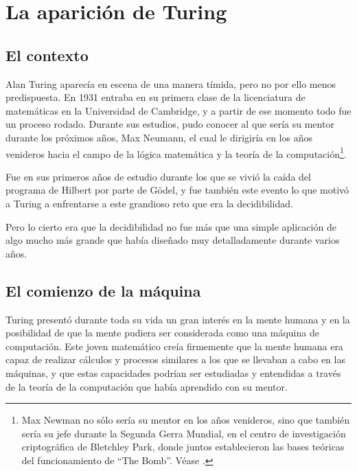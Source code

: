 
\chapter{La aparición de Turing}

\section{El contexto}
Alan Turing aparecía en escena de una manera tímida, pero no por ello menos predispuesta. En 1931 entraba en su primera clase de la licenciatura de matemáticas en la Universidad de Cambridge, 
y a partir de ese momento todo fue un proceso rodado. Durante sus estudios, pudo conocer al que sería su mentor durante los próximos años, Max Neumann, el cual le dirigiría en los años venideros 
hacia el campo de la lógica matemática y la teoría de la computación\footnote{Max Newman no sólo sería su mentor en los años venideros, sino que también sería su jefe durante la Segunda Gerra Mundial,
en el centro de investigación criptográfica de Bletchley Park, donde juntos establecieron las bases teóricas del funcionamiento de ``The Bomb''. Véase \cite{copeland2006colossus}.}.

Fue en sus primeros años de estudio durante los que se vivió la caída del programa de Hilbert por parte de Gödel, y fue también este evento lo que motivó a Turing a enfrentarse a este grandioso 
reto que era la decidibilidad.

Pero lo cierto era que la decidibilidad no fue más que una simple aplicación de algo mucho más grande que había diseñado muy detalladamente durante varios años.

\section{El comienzo de la máquina}

Turing presentó durante toda su vida un gran interés en la mente humana y en la posibilidad de que la mente pudiera ser considerada como una máquina de computación. Este joven matemático creía firmemente que 
la mente humana era capaz de realizar cálculos y procesos similares a los que se llevaban a cabo en las máquinas, y que estas capacidades podrían ser estudiadas y entendidas a través 
de la teoría de la computación que había aprendido con su mentor.

